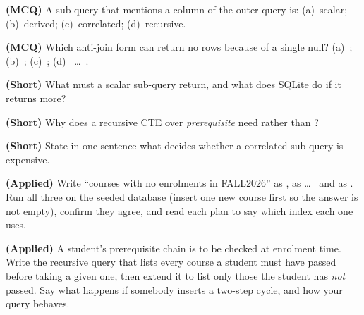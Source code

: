 \begin{reviewq}
  \item \textbf{(MCQ)} A sub-query that mentions a column of the outer query
        is: (a)~scalar; (b)~derived; (c)~correlated; (d)~recursive.
  \item \textbf{(MCQ)} Which anti-join form can return no rows because of a
        single null? (a)~; (b)~;
        (c)~; (d)~ \dots\ .
  \item \textbf{(Short)} What must a scalar sub-query return, and what does
        SQLite do if it returns more?
  \item \textbf{(Short)} Why does a recursive CTE over \textit{prerequisite}
        need  rather than ?
  \item \textbf{(Short)} State in one sentence what decides whether a
        correlated sub-query is expensive.
  \item \textbf{(Applied)} Write ``courses with no enrolments in FALL2026''
        as , as  \dots\  and
        as . Run all three on the seeded database (insert one
        new course first so the answer is not empty), confirm they agree, and
        read each plan to say which index each one uses.
  \item \textbf{(Applied)} A student's prerequisite chain is to be checked at
        enrolment time. Write the recursive query that lists every course a
        student must have passed before taking a given one, then extend it to
        list only those the student has \emph{not} passed. Say what happens if
        somebody inserts a two-step cycle, and how your query behaves.
\end{reviewq}
